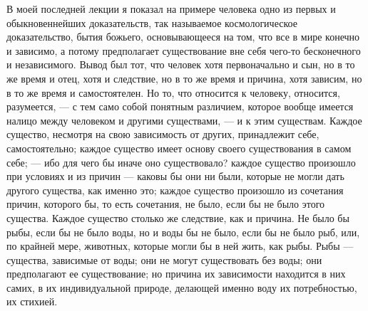 \documentclass[12pt]{article}
\begin{document}
В моей последней лекции я показал на примере человека одно из первых и обыкновеннейших доказательств, так называемое космологическое доказательство, бытия божьего, основывающееся на том, что все в мире конечно и зависимо, а потому предполагает существование вне себя чего-то бесконечного и независимого. Вывод был тот, что человек хотя первоначально и сын, но в то же время и отец, хотя и следствие, но в то же время и причина, хотя зависим, но в то же время и самостоятелен. Но то, что относится к человеку, относится, разумеется, --- с тем само собой понятным различием, которое вообще имеется налицо между человеком и другими существами, --- и к этим существам. Каждое существо, несмотря на свою зависимость от других, принадлежит себе, самостоятельно; каждое существо имеет основу своего существования в самом себе; --- ибо для чего бы иначе оно существовало? каждое существо произошло при условиях и из причин --- каковы бы они ни были, которые не могли дать другого существа, как именно это; каждое существо произошло из сочетания причин, которого бы, то есть сочетания, не было, если бы не было этого существа. Каждое существо столько же следствие, как и причина. Не было бы рыбы, если бы не было воды, но и воды бы не было, если бы не было рыб, или, по крайней мере, животных, которые могли бы в ней жить, как рыбы. Рыбы --- существа, зависимые от воды; они не могут существовать без воды; они предполагают ее существование; но причина их зависимости находится в них самих, в их индивидуальной природе, делающей именно воду их потребностью, их стихией. 
\end{document}
